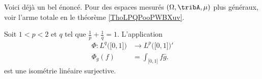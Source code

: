 Voici déjà un bel énoncé. Pour des espaces mesurés \( (\Omega,\tribA,\mu)\) plus généraux, voir l'arme totale en le théorème \ref{ThoLPQPooPWBXuv}.

\begin{proposition} \label{PropOAVooYZSodR}
Soit \( 1<p<2\) et \( q\) tel que \( \frac{1}{ p }+\frac{1}{ q }=1\). L'application
\begin{equation}
    \begin{aligned}
        \Phi\colon L^q\big( \mathopen[ 0 , 1 \mathclose] \big) & \to  L^p\big( \mathopen[ 0 , 1 \mathclose] \big)' \\
        \Phi_g(f)                                              & = \int_{\mathopen[ 0 , 1 \mathclose]}f\bar g.
    \end{aligned}
\end{equation}
est une isométrie linéaire surjective.
\end{proposition}


